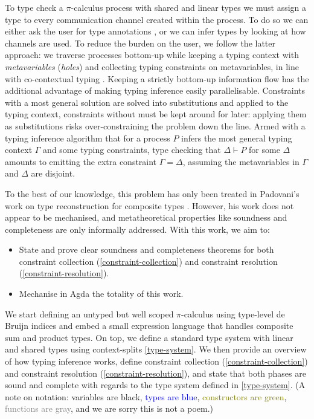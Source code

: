 \documentclass[sigplan,screen,review]{acmart}
\theoremstyle{definition}\newtheorem{mytheorem}{Theorem}[section]
\newcommand{\picalc}{$\pi$-calculus}
\begin{document}
To type check a \picalc{} process with shared and linear types we must assign a type to every communication channel created within the process.
To do so we can either ask the user for type annotations \cite{ZalakainD21}, or we can infer types by looking at how channels are used.
To reduce the burden on the user, we follow the latter approach: we traverse processes bottom-up while keeping a typing context with \emph{metavariables} (\emph{holes}) and collecting typing constraints on metavariables, in line with co-contextual typing \cite{ErdwegBKKM15}.
Keeping a strictly bottom-up information flow has the additional advantage of making typing inference easily parallelisable.
Constraints with a most general solution are solved into substitutions and applied to the typing context, constraints without must be kept around for later: applying them as substitutions risks over-constraining the problem down the line.
Armed with a typing inference algorithm that for a process $P$ infers the most general typing context $\Gamma$ and some typing constraints, type checking that $\Delta \vdash P$ for some $\Delta$ amounts to emitting the extra constraint $\Gamma = \Delta$, assuming the metavariables in $\Gamma$ and $\Delta$ are disjoint.

To the best of our knowledge, this problem has only been treated in Padovani's work on type reconstruction for composite types \cite{Padovani15}.
However, his work does not appear to be mechanised, and metatheoretical properties like soundness and completeness are only informally addressed.
With this work, we aim to:
\begin{itemize}
  \item State and prove clear soundness and completeness theorems for both constraint collection (\autoref{constraint-collection}) and constraint resolution (\autoref{constraint-resolution}).
  \item Mechanise in Agda the totality of this work.
\end{itemize}

We start defining an untyped but well scoped \picalc{} using type-level de Bruijn indices \cite{deBruijn72} and embed a small expression language that handles composite sum and product types.
On top, we define a standard type system with linear and shared types using context-splits \autoref{type-system}.
We then provide an overview of how typing inference works, define constraint collection (\autoref{constraint-collection}) and constraint resolution (\autoref{constraint-resolution}), and state that both phases are sound and complete with regards to the type system defined in \autoref{type-system}.
(A note on notation: variables are black, \textcolor{blue}{types are blue}, \textcolor{olive}{constructors are green}, \textcolor{gray}{functions are gray}, and we are sorry this is not a poem.)
\end{document}
